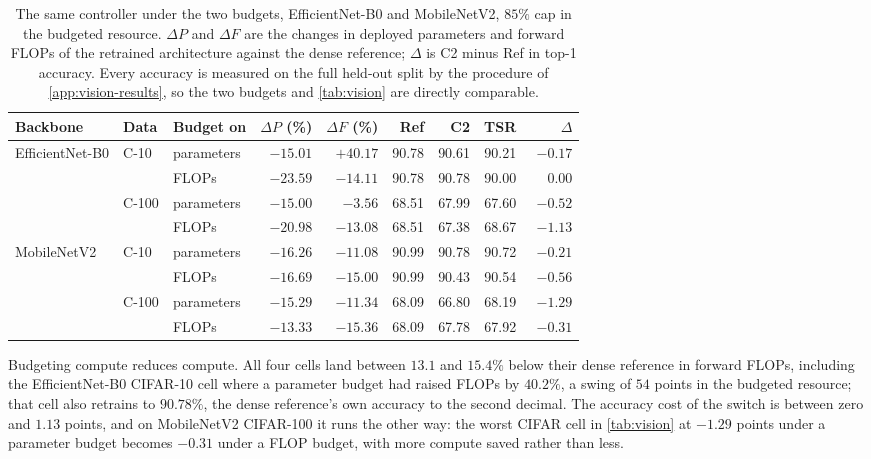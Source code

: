 \documentclass[10pt]{article}
\theoremstyle{paper}
\begin{document}
\begin{table}[h]
\centering
\caption{The same controller under the two budgets, EfficientNet-B0 and MobileNetV2, $85\%$ cap in the budgeted
resource. $\Delta P$ and $\Delta F$ are the changes in deployed parameters and forward FLOPs of
the retrained architecture against the dense reference; $\Delta$ is C2 minus Ref in top-1
accuracy. Every accuracy is measured on the full held-out split by the procedure of
\cref{app:vision-results}, so the two budgets and \cref{tab:vision} are directly comparable.}
\label{tab:flops}
\footnotesize
\setlength{\tabcolsep}{4.0pt}
\begin{tabular}{@{}lllrrrrrr@{}}
\toprule
Backbone & Data & Budget on & $\Delta P$ (\%) & $\Delta F$ (\%) & Ref & C2 & TSR & $\Delta$ \\
\midrule
EfficientNet-B0 & C-10  & parameters & $-15.01$ & $+40.17$ & 90.78 & 90.61 & 90.21 & $-0.17$ \\
                &       & FLOPs      & $-23.59$ & $-14.11$ & 90.78 & 90.78 & 90.00 & $\phantom{-}0.00$ \\
                & C-100 & parameters & $-15.00$ & $-3.56$  & 68.51 & 67.99 & 67.60 & $-0.52$ \\
                &       & FLOPs      & $-20.98$ & $-13.08$ & 68.51 & 67.38 & 68.67 & $-1.13$ \\
\midrule
MobileNetV2     & C-10  & parameters & $-16.26$ & $-11.08$ & 90.99 & 90.78 & 90.72 & $-0.21$ \\
                &       & FLOPs      & $-16.69$ & $-15.00$ & 90.99 & 90.43 & 90.54 & $-0.56$ \\
                & C-100 & parameters & $-15.29$ & $-11.34$ & 68.09 & 66.80 & 68.19 & $-1.29$ \\
                &       & FLOPs      & $-13.33$ & $-15.36$ & 68.09 & 67.78 & 67.92 & $-0.31$ \\
\bottomrule
\end{tabular}
\end{table}

Budgeting compute reduces compute. All four cells land between $13.1$ and $15.4\%$ below their dense reference in forward FLOPs, including the EfficientNet-B0 CIFAR-10 cell where a parameter budget had raised FLOPs by $40.2\%$, a swing of $54$ points in the budgeted resource; that cell also retrains to $90.78\%$, the dense reference's own accuracy to the second decimal. The accuracy cost of the switch is between zero and $1.13$ points, and on MobileNetV2 CIFAR-100 it runs the other way: the worst CIFAR cell in \cref{tab:vision} at $-1.29$ points under a parameter budget becomes $-0.31$ under a FLOP budget, with more compute saved rather than less.
\end{document}
